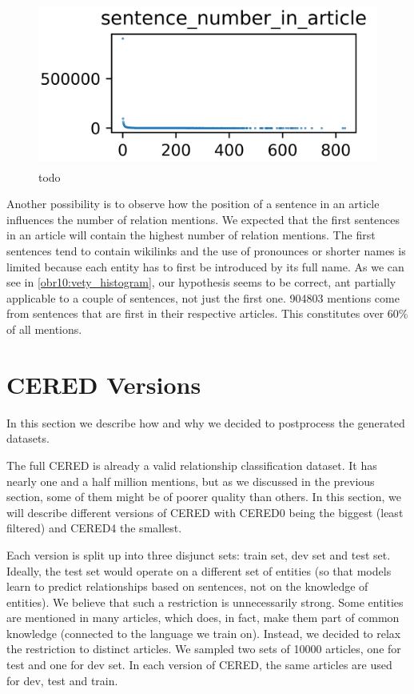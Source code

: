 \begin{figure}[h]\centering
\includegraphics[width=119mm, height=54mm]{./img/CERED0_sentence_number_histogram}
\caption{todo}
\label{obr10:vety_histogram}
\end{figure}


Another possibility is to observe how the position of a sentence in an article influences the number of relation mentions. We expected that the first sentences in an article will contain the highest number of relation mentions. The first sentences tend to contain wikilinks and the use of pronounces or shorter names is limited because each entity has to first be introduced by its full name. As we can see in \autoref{obr10:vety_histogram}, our hypothesis seems to be correct, ant partially applicable to a couple of sentences, not just the first one. 904803 mentions come from sentences that are first in their respective articles. This constitutes over 60\% of all mentions.





\section{CERED Versions}
In this section we describe how and why we decided to postprocess the generated datasets. 

The full CERED is already a valid relationship classification dataset. It has nearly one and a half million mentions, but as we discussed in the previous section, some of them might be of poorer quality than others. In this section, we will describe different versions of CERED with CERED0 being the biggest (least filtered) and CERED4 the smallest. 

Each version is split up into three disjunct sets: train set, dev set and test set. Ideally, the test set would operate on a different set of entities (so that models learn to predict relationships based on sentences, not on the knowledge of entities). We believe that such a restriction is unnecessarily strong. Some entities are mentioned in many articles, which does, in fact, make them part of common knowledge (connected to the language we train on). Instead, we decided to relax the restriction to distinct articles. We sampled two sets of 10000 articles, one for test and one for dev set. In each version of CERED, the same articles are used for dev, test and train.
